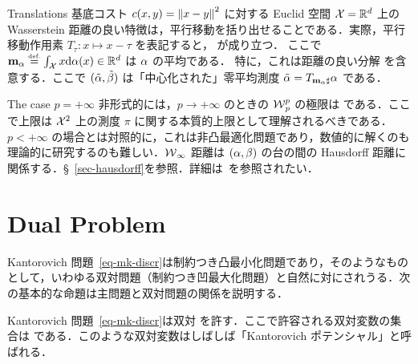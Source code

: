\begin{rem1}{Translations}
基底コスト $c(x,y)=\left\| x-y \right\|^2$ に対する Euclid 空間 $\mathcal{X}=\mathbb{R}^d$ 上の Wasserstein 距離の良い特徴は，平行移動を括り出せることである．実際，平行移動作用素 $T_{\tau} : x \mapsto x-\tau$ を表記すると，
が成り立つ．
ここで $\mathbf{m}_{\alpha} \stackrel{\mbox{\upshape\tiny def.}}{=} \int_{\mathcal{X}} x \mathrm{d}\alpha(x) \in \mathbb{R}^d$ は $\alpha$ の平均である．
%
特に，これは距離の良い分解
を含意する．ここで $(\tilde{\alpha},\tilde{\beta})$ は「中心化された」零平均測度 $\tilde{\alpha}=T_{\mathbf{m}_{\alpha}\sharp}\alpha$ である．
\end{rem1}
\pagebreak
\begin{rem1}{The case $p = +\infty$}\label{rem-p-inf}
非形式的には，$p \rightarrow +\infty$ のときの $\operatorname{\mathcal{W}}_p^p$ の極限は
である．ここで上限は $\mathcal{X}^2$ 上の測度 $\pi$ に関する本質的上限として理解されるべきである．
%
$p<+\infty$ の場合とは対照的に，これは非凸最適化問題であり，数値的に解くのも理論的に研究するのも難しい．$\operatorname{\mathcal{W}}_{\infty}$ 距離は $(\alpha,\beta)$ の台の間の Hausdorff 距離に関係する．\S~\ref{sec-hausdorff}を参照．詳細は~\citep{champion2008wasserstein}を参照されたい．
\end{rem1}



\section{Dual Problem}

Kantorovich 問題~\eqref{eq-mk-discr}は制約つき凸最小化問題であり，そのようなものとして，いわゆる双対問題（制約つき凹最大化問題）と自然に対にされうる．次の基本的な命題は主問題と双対問題の関係を説明する．

\begin{prop}\label{prop-duality-discr}
Kantorovich 問題~\eqref{eq-mk-discr}は双対
\eql{\label{eq-dual}
	\MKD_\C(\a,\b) =
	\umax{(\fD,\gD) \in \PotentialsD(\C)} \dotp{\fD}{\a} + \dotp{\gD}{\b},
}
を許す．ここで許容される双対変数の集合は
である．このような双対変数はしばしば「Kantorovich ポテンシャル」と呼ばれる．
\end{prop}

